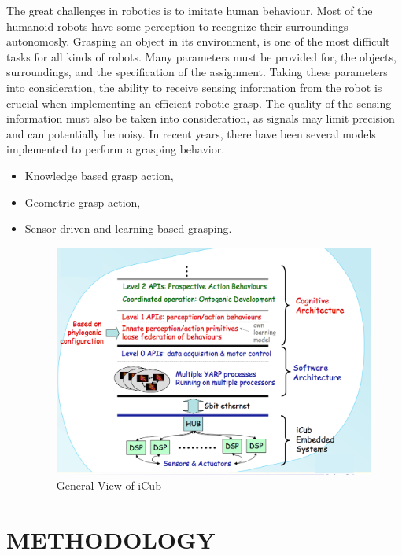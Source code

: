 \documentclass[a4paper, 11pt]{report}
\begin{document}
The great challenges in robotics is to imitate human behaviour. Most of the 
humanoid robots have some perception to recognize their surroundings 
autonomosly. Grasping an object in its environment, is one of the most 
difficult tasks for all kinds of robots. Many parameters must be provided for, 
the objects, surroundings, and the specification of the assignment. Taking 
these parameters into consideration, the ability to receive sensing information 
from the robot is crucial when implementing an efficient robotic grasp. The 
quality of the sensing information 
must also be taken into consideration, as signals may limit precision and can 
potentially be noisy. In recent years, there have been several models 
implemented to perform a grasping behavior.\cite{vernon}
\begin{itemize}
\item Knowledge based grasp action,
\item Geometric grasp action,
\item Sensor driven and learning based grasping.
\begin{figure}[h!]
\centering
\includegraphics[width=0.7\linewidth]{generalView}
\caption{General View of iCub}
\label{fig:generalView}
\end{figure}
\end{itemize}
\chapter{METHODOLOGY}
\end{document}
